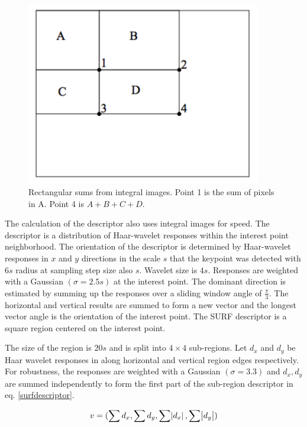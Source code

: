 \documentclass[english,12pt,a4paper,pdftex,elec,utf8, table]{aaltothesis}
\begin{document}
\begin{figure}[htb]
\begin{center}
\includegraphics[height=8cm]{figures/integralimage}
\end{center}
\caption{Rectangular sums from integral images. Point 1 is the sum of pixels in A. Point 4 is $A + B + C + D$.\cite{Viola2001}}
\label{integralimagefig}
\end{figure}
The calculation of the descriptor also uses integral images for speed. The descriptor is a distribution of Haar-wavelet responses within the interest point neighborhood. \cite{Bay2006}
The orientation of the descriptor is determined by Haar-wavelet responses in $x$ and $y$ directions in the scale $s$ that the keypoint was detected with $6s$ radius at sampling step size also $s$. Wavelet size is $4s$. Responses are weighted with a Gaussian $(\sigma = 2.5s)$ at the interest point. The dominant direction is estimated by summing up the responses over a sliding window angle of $\frac{\pi}{3}$. The horizontal and vertical results are summed to form a new vector and the longest vector angle is the orientation of the interest point. The SURF descriptor is a square region centered on the interest point. \cite{Bay2006}

The size of the region is $20s$ and is split into $4 \times 4$ sub-regions. Let $d_x$ and $d_y$ be Haar wavelet responses in along horizontal and vertical region edges respectively. For robustness, the responses are weighted with a Gaussian $(\sigma = 3.3)$ and $d_x, d_y$ are summed independently to form the first part of the sub-region descriptor in eq. \ref{surfdescriptor}. \cite{Bay2006}

\begin{equation}
  \label{surfdescriptor}
v = (\sum d_x, \sum d_y, \sum \abs{d_x}, \sum \abs{d_y})
  \end{equation}
\end{document}
